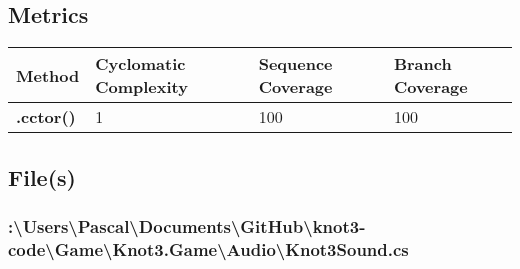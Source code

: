 \documentclass[a4paper,10pt]{article}
\begin{document}
\subsection{Metrics}
\begin{longtable}[l]{|l|l|l|l|}
\hline
\textbf{Method} & \textbf{Cyclomatic Complexity} & \textbf{Sequence Coverage} & \textbf{Branch Coverage}\\
\hline
\textbf{.cctor()} & 1 & 100 & 100\\
\hline
\end{longtable}
\subsection{File(s)}
\subsubsection{:\textbackslash Users\textbackslash Pascal\textbackslash Documents\textbackslash GitHub\textbackslash knot3-code\textbackslash Game\textbackslash Knot3.Game\textbackslash Audio\textbackslash Knot3Sound.cs}
\end{document}
